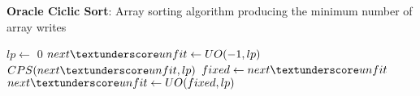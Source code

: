 \begin{algorithm}
\caption*{\textbf{Oracle Ciclic Sort}: Array sorting algorithm producing the minimum number of array writes}
\begin{algorithmic}[1]
	 $lp \leftarrow$ 0
	\State $next \textunderscore unfit \leftarrow UO(-1,lp)$
		\State $CPS(next \textunderscore unfit, lp)$
		\State $ fixed \leftarrow next \textunderscore unfit $
		\State $ next \textunderscore unfit \leftarrow UO(fixed,lp)$
	\EndWhile
\EndProcedure
\end{algorithmic}
\end{algorithm}
